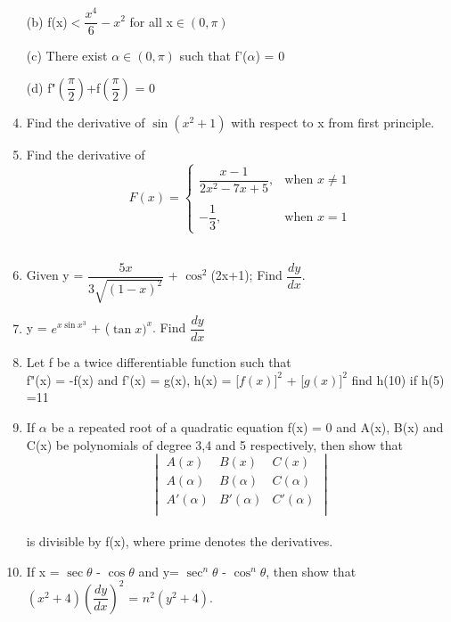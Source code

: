 \documentclass[journal,12pt,onecoloumn]{IEEEtran}
\begin{document}
\begin{enumerate}[label=\arabic*]
	\item [(b)]f(x)$<\dfrac{x^4}{6}-x^2$ for all x$\in(0,\pi)$\\
	\item [(c)]There exist $\alpha \in (0,\pi)$ such that f'($\alpha$) = 0\\
	\item [(d)]f"$\left(\dfrac{\pi}{2}\right)$+f$\left(\dfrac{\pi}{2}\right)$ = 0\\
	\item Find the derivative of $\sin(x^2+1)$ with respect to x from first principle.\\
	\item Find the derivative of\\
	$$
	F(x)=
	\begin{cases}
	\dfrac{x-1}{2x^2-7x+5},   & \text{when $x \neq 1$}\\
	\\
	-\dfrac{1}{3},   &\text{when $x = 1$}
	\end{cases}
	$$
	\\
	\item Given y = $\dfrac{5x}{3\sqrt{(1-x)^2}}$ + $\cos^2$(2x+1); Find $\dfrac{dy}{dx}$.
	\item y = $e^{x\sin x^3}$ + ($\tan x)^x$. Find  $\dfrac{dy}{dx}$\\
	\item Let f be a twice differentiable function such that\\
	f"(x) = -f(x) and f'(x) = g(x), h(x) = [$f(x)]^2$ + [$g(x)]^2$
	find h(10) if h(5) =11\\
	\item If $\alpha$ be a repeated root of a quadratic equation f(x) = 0 and A(x), B(x) and C(x) be polynomials of degree 3,4 and 5 respectively, then show that \begin{equation*}
   \begin{vmatrix} 
   A(x) & B(x) & C(x)  \\
   A(\alpha) & B(\alpha) & C(\alpha)  \\
   A'(\alpha) & B'(\alpha) & C'(\alpha)  \\
   \end{vmatrix} 
\end{equation*}\\
	is divisible by f(x), where prime denotes the derivatives.\\
	\item If x = $\sec \theta$ - $\cos \theta$ and y= $\sec^n \theta$ - $\cos^n \theta$, then show that $(x^2 + 4)\left(\dfrac{dy}{dx}\right)^2$ = $n^2(y^2 + 4)$.\\

\end{enumerate}
\end{document}
